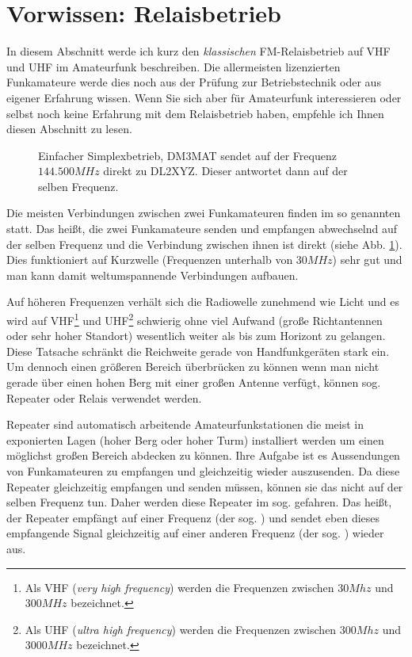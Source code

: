 \section{Vorwissen: Relaisbetrieb} \label{sec:vorwissen} 
In diesem Abschnitt werde ich kurz den \emph{klassischen} FM-Relaisbetrieb auf VHF und UHF im Amateurfunk beschreiben. Die allermeisten lizenzierten Funkamateure werde dies noch aus der Prüfung zur Betriebstechnik oder aus eigener Erfahrung wissen. Wenn Sie sich aber für Amateurfunk interessieren oder selbst noch keine Erfahrung mit dem Relaisbetrieb haben, empfehle ich Ihnen diesen Abschnitt zu lesen. 

\begin{figure}[!ht]
 \centering
 
 
 \caption{Einfacher Simplexbetrieb, DM3MAT sendet auf der Frequenz $144.500 MHz$ direkt zu DL2XYZ. Dieser antwortet dann auf der selben Frequenz.} \label{fig:basicsimlpex}
\end{figure}

Die meisten Verbindungen zwischen zwei Funkamateuren finden im so genannten  statt. Das heißt, die zwei Funkamateure senden und empfangen abwechselnd auf der selben Frequenz und die Verbindung zwischen ihnen ist direkt (siehe Abb. \ref{fig:basicsimlpex}). Dies funktioniert auf Kurzwelle (Frequenzen unterhalb von $30MHz$) sehr gut und man kann damit weltumspannende Verbindungen aufbauen. 

Auf höheren Frequenzen verhält sich die Radiowelle zunehmend wie Licht und es wird auf VHF\footnote{Als VHF (\emph{very high frequency}) werden die Frequenzen zwischen $30Mhz$ und $300MHz$ bezeichnet.} und UHF\footnote{Als UHF (\emph{ultra high frequency}) werden die Frequenzen zwischen $300Mhz$ und $3000MHz$ bezeichnet.} schwierig ohne viel Aufwand (große Richtantennen oder sehr hoher Standort) wesentlich weiter als bis zum Horizont zu gelangen. Diese Tatsache schränkt die Reichweite gerade von Handfunkgeräten stark ein. Um dennoch einen größeren Bereich überbrücken zu können wenn man nicht gerade über einen hohen Berg mit einer großen Antenne verfügt, können sog. Repeater oder Relais verwendet werden. 

Repeater sind automatisch arbeitende Amateurfunkstationen die meist in exponierten Lagen (hoher Berg oder hoher Turm) installiert werden um einen möglichst großen Bereich abdecken zu können. Ihre Aufgabe ist es Aussendungen von Funkamateuren zu empfangen und gleichzeitig wieder auszusenden. Da diese Repeater gleichzeitig empfangen und senden müssen, können sie das nicht auf der selben Frequenz tun. Daher werden diese Repeater im sog.  gefahren. Das heißt, der Repeater empfängt auf einer Frequenz (der sog. ) und sendet eben dieses empfangende Signal gleichzeitig auf einer anderen Frequenz (der sog. ) wieder aus. 

